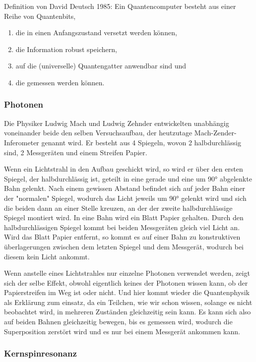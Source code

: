 Definition von David Deutsch 1985:
Ein Quantencomputer besteht aus einer Reihe von Quantenbits,
\begin{enumerate}
	\item die in einen Anfangszustand versetzt werden können,
	\item die Information robust speichern,
	\item auf die (universelle) Quantengatter anwendbar sind und
	\item die gemessen werden können.
\end{enumerate}

\subsubsection{Photonen}
\label{sec:Photonen}

Die Physiker Ludwig Mach und Ludwig Zehnder entwickelten unabhängig voneinander beide den selben Versuchsaufbau, der heutzutage Mach-Zender-Inferometer genannt wird. Er besteht aus 4 Spiegeln, wovon 2 halbdurchlässig sind, 2 Messgeräten und einem Streifen Papier.

Wenn ein Lichtstrahl in den Aufbau geschickt wird, so wird er über den ersten Spiegel, der halbdurchlässig ist, geteilt in eine gerade und eine um 90° abgelenkte Bahn gelenkt. Nach einem gewissen Abstand befindet sich auf jeder Bahn einer der "normalen" Spiegel, wodurch das Licht jeweils um 90° gelenkt wird und sich die beiden dann an einer Stelle kreuzen, an der der zweite halbdurchlässige Spiegel montiert wird. In eine Bahn wird ein Blatt Papier gehalten. Durch den halbdurchlässigen Spiegel kommt bei beiden Messgeräten gleich viel Licht an. Wird das Blatt Papier entfernt, so kommt es auf einer Bahn zu konstruktiven überlagerungen zwischen dem letzten Spiegel und dem Messgerät, wodurch bei diesem kein Licht ankommt.

Wenn anstelle eines Lichtstrahles nur einzelne Photonen verwendet werden, zeigt sich der selbe Effekt, obwohl eigentlich keines der Photonen wissen kann, ob der Papierstreifen im Weg ist oder nicht. Und hier kommt wieder die Quantenphysik als Erklärung zum einsatz, da ein Teilchen, wie wir schon wissen, solange es nicht beobachtet wird, in mehreren Zuständen gleichzeitig sein kann. Es kann sich also auf beiden Bahnen gleichzeitig bewegen, bis es gemessen wird, wodurch die Superposition zerstört wird und es nur bei einem Messgerät ankommen kann.


\subsubsection{Kernspinresonanz}
\label{sec:Kernspinresonanz}

